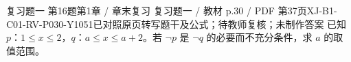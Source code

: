 \par\noindent\begin{minipage}{\linewidth}
\begin{bankitem}{复习题一 第16题}{第1章 / 章末复习 复习题一 / 教材 p.30 / PDF 第37页}{XJ-B1-C01-RV-P030-Y1051}{已对照原页转写题干及公式；待教师复核；未制作答案}
已知 $p$：$1\le x\le2$，$q$：$a\le x\le a+2$。若 $\neg p$ 是 $\neg q$ 的必要而不充分条件，求 $a$ 的取值范围。
\end{bankitem}
\end{minipage}\par\medskip

